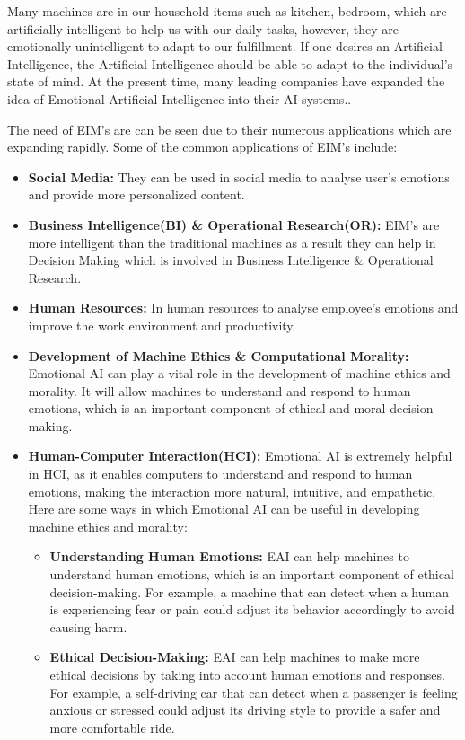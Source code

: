 Many machines are in our household items such as kitchen, bedroom, which are artificially intelligent to help us with our daily tasks, however, they are emotionally unintelligent to adapt to our fulfillment. If one desires an Artificial Intelligence, the Artificial Intelligence should be able to adapt to the individual's state of mind. At the present time, many leading companies have expanded the idea of Emotional Artificial Intelligence into their AI systems.\cite{ISSN-2456-2165}.

The need of EIM's are can be seen due to their numerous applications which are expanding rapidly.
Some of the common applications of EIM's include:
\begin{itemize}
	\item \textbf{Social Media:} They can be used in social media to analyse user's emotions and provide more personalized content.
	\item \textbf{Business Intelligence(BI) \& Operational Research(OR):} EIM's are more intelligent than the traditional machines as a result they can help in Decision Making which is involved in Business Intelligence \& Operational Research.
	\item \textbf{Human Resources:} In human resources to analyse employee's emotions and improve the work environment and productivity.
	\item \textbf{Development of Machine Ethics \& Computational Morality:} Emotional AI can play a vital role in the development of machine ethics and morality. It will allow machines to understand and respond to human emotions, which is an important component of ethical and moral decision-making.
	\item \textbf{Human-Computer Interaction(HCI):} Emotional AI is extremely helpful in HCI, as it enables computers to understand and respond to human emotions, making the interaction more natural, intuitive, and empathetic. Here are some ways in which Emotional AI can be useful in developing machine ethics and morality:
	\begin{itemize}
		\item \textbf{Understanding Human Emotions:} EAI can help machines to understand human emotions, which is an important component of ethical decision-making. For example, a machine that can detect when a human is experiencing fear or pain could adjust its behavior accordingly to avoid causing harm.
		\item \textbf{Ethical Decision-Making:} EAI can help machines to make more ethical decisions by taking into account human emotions and responses. For example, a self-driving car that can detect when a passenger is feeling anxious or stressed could adjust its driving style to provide a safer and more comfortable ride.

\end{itemize}
\end{itemize}
